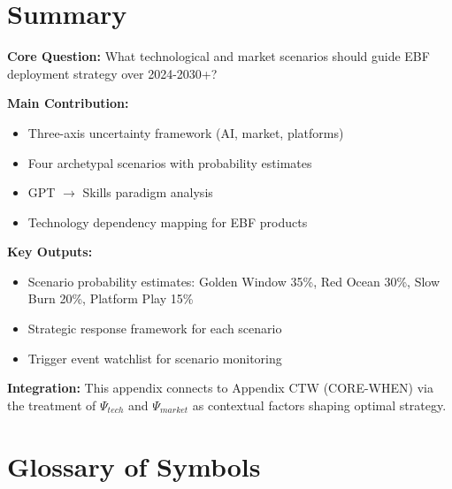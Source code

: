 \section{Summary}
\label{sec:vvv1-summary}

\begin{tcolorbox}[colback=green!10!white, colframe=green!75!black,
    title=\textbf{Appendix UNMAPPED_VVV.1: Summary}]

\textbf{Core Question:} What technological and market scenarios should guide
EBF deployment strategy over 2024-2030+?

\textbf{Main Contribution:}
\begin{itemize}[nosep]
    \item Three-axis uncertainty framework (AI, market, platforms)
    \item Four archetypal scenarios with probability estimates
    \item GPT $\to$ Skills paradigm analysis
    \item Technology dependency mapping for EBF products
\end{itemize}

\textbf{Key Outputs:}
\begin{itemize}[nosep]
    \item Scenario probability estimates: Golden Window 35\%, Red Ocean 30\%,
          Slow Burn 20\%, Platform Play 15\%
    \item Strategic response framework for each scenario
    \item Trigger event watchlist for scenario monitoring
\end{itemize}

\textbf{Integration:} This appendix connects to Appendix CTW (CORE-WHEN) via
the treatment of $\Psi_{tech}$ and $\Psi_{market}$ as contextual factors
shaping optimal strategy.

\end{tcolorbox}


\section{Glossary of Symbols}
\label{sec:vvv1-glossary}


